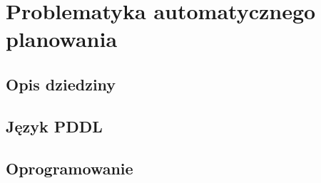\chapter{Problematyka automatycznego planowania}
\section{Opis dziedziny}
\section{Język PDDL}
\section{Oprogramowanie}
